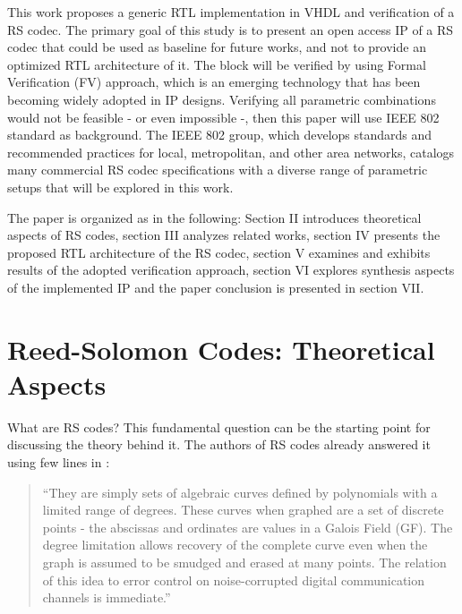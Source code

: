\documentclass[conference]{IEEEtran}
\begin{document}
\par This work proposes a generic RTL implementation in VHDL and verification of a RS codec. The primary goal of this study is to present an open access IP of a RS codec that could be used as baseline for future works, and not to provide an optimized RTL architecture of it. The block will be verified by using Formal Verification (FV) approach, which is an emerging technology that has been becoming widely adopted in IP designs. Verifying all parametric combinations would not be feasible - or even impossible -, then this paper will use IEEE 802 standard as background. The IEEE 802 group, which develops standards and recommended practices for local, metropolitan, and other area networks, catalogs many commercial RS codec specifications with a diverse range of parametric setups that will be explored in this work.     

\par The paper is organized as in the following: Section II introduces theoretical aspects of RS codes, section III analyzes related works, section IV presents the proposed RTL architecture of the RS codec, section V examines and exhibits results of the adopted verification approach, section VI explores synthesis aspects of the implemented IP and the paper conclusion is presented in section VII.

\section{Reed-Solomon Codes: Theoretical Aspects}

\par What are RS codes? This fundamental question can be the starting point for discussing the theory behind it. The authors of RS codes  already answered it using few lines in \cite{b5}:

\begin{quote}
``They are simply sets of algebraic curves defined by polynomials with a limited range of degrees. These curves when graphed are a set of discrete points - the abscissas and ordinates are values in a Galois Field (GF). The degree limitation allows recovery of the complete curve even when the graph is assumed to be smudged and erased at many points. The relation of this idea to error control on noise-corrupted digital communication channels is immediate.''
\end{quote}
\end{document}
